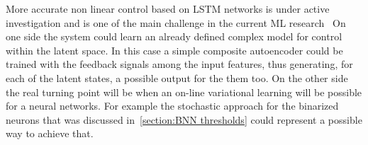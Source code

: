 More accurate non linear control based on LSTM networks is under active investigation and is one of the main challenge in the current ML research~\cite{Lesort_2018, an2019unsupervised}
On one side the system could learn an already defined complex model for control within the latent space. In this case a simple composite autoencoder could be trained with the feedback signals among the input features, thus generating, for each of the latent states, a possible output for the them too.
On the other side the real turning point will be when an on-line variational learning will be possible for a neural networks. 
For example the stochastic approach for the binarized neurons that was discussed in~\cref{section:BNN thresholds} could represent a possible way to achieve that.




